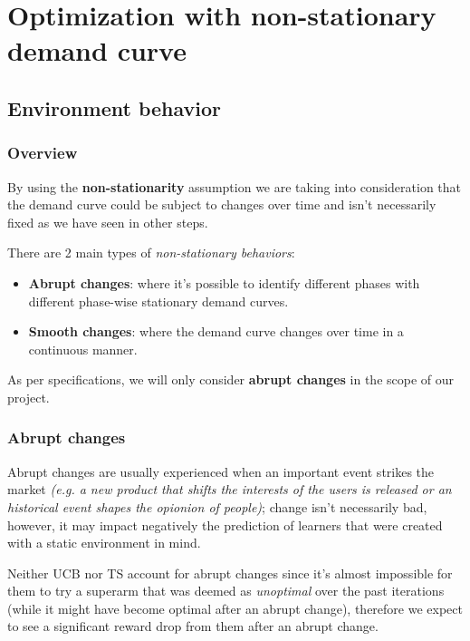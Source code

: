 \chapter{Optimization with non-stationary demand curve}
\label{chap:ns_demand}

\section{Environment behavior}

\subsection{Overview}

By using the \textbf{non-stationarity} assumption we are taking into consideration that the demand curve could be subject to changes over time and isn't necessarily fixed as we have seen in other steps.

There are 2 main types of \textit{non-stationary behaviors}:
\begin{itemize}
    \item \textbf{Abrupt changes}: where it's possible to identify different phases with different phase-wise stationary demand curves.
    \item \textbf{Smooth changes}: where the demand curve changes over time in a continuous manner.
\end{itemize}

As per specifications, we will only consider \textbf{abrupt changes} in the scope of our project.

\subsection{Abrupt changes}

Abrupt changes are usually experienced when an important event strikes the market \textit{(e.g. a new product that shifts the interests of the users is released or an historical event shapes the opionion of people)}; change isn't necessarily bad, however, it may impact negatively the prediction of learners that were created with a static environment in mind.

Neither UCB nor TS account for abrupt changes since it's almost impossible for them to try a superarm that was deemed as \textit{unoptimal} over the past iterations (while it might have become optimal after an abrupt change), therefore we expect to see a significant reward drop from them after an abrupt change.

